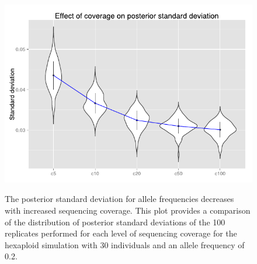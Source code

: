 \documentclass[11pt,english,letterpaper,oneside]{article}
\begin{document}
\begin{figure}
\centering
\caption{The posterior standard deviation for allele frequencies decreases with increased sequencing coverage. This plot provides a comparison of the distribution of posterior standard deviations of the 100 replicates performed for each level of sequencing coverage for the hexaploid simulation with 30 individuals and an allele frequency of 0.2.}
\vspace{0.25in}
\includegraphics{fig/figure4-coverage-sd}
\label{fig:coverage-sd}
\end{figure}
\end{document}

